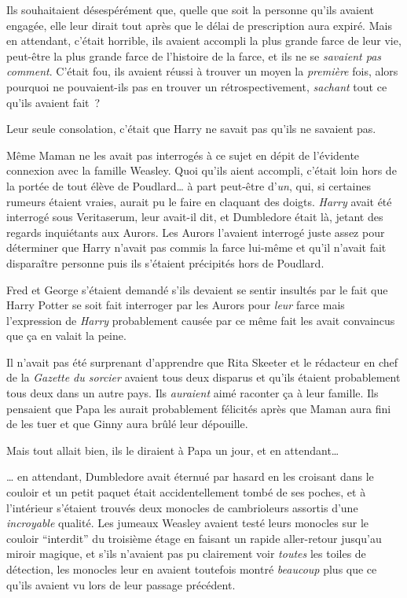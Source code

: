 Ils souhaitaient désespérément que, quelle que soit la personne qu'ils avaient engagée, elle leur dirait tout après que le délai de prescription aura expiré. Mais en attendant, c'était horrible, ils avaient accompli la plus grande farce de leur vie, peut-être la plus grande farce de l'histoire de la farce, et ils ne se \emph{savaient pas comment}. C'était fou, ils avaient réussi à trouver un moyen la \emph{première} fois, alors pourquoi ne pouvaient-ils pas en trouver un rétrospectivement, \emph{sachant} tout ce qu'ils avaient fait~?

Leur seule consolation, c'était que Harry ne savait pas qu'ils ne savaient pas.

Même Maman ne les avait pas interrogés à ce sujet en dépit de l'évidente connexion avec la famille Weasley. Quoi qu'ils aient accompli, c'était loin hors de la portée de tout élève de Poudlard… à part peut-être d'\emph{un}, qui, si certaines rumeurs étaient vraies, aurait pu le faire en claquant des doigts. \emph{Harry} avait été interrogé sous Veritaserum, leur avait-il dit, et Dumbledore était là, jetant des regards inquiétants aux Aurors. Les Aurors l'avaient interrogé juste assez pour déterminer que Harry n'avait pas commis la farce lui-même et qu'il n'avait fait disparaître personne puis ils s'étaient précipités hors de Poudlard.

Fred et George s'étaient demandé s'ils devaient se sentir insultés par le fait que Harry Potter se soit fait interroger par les Aurors pour \emph{leur} farce mais l'expression de \emph{Harry} probablement causée par ce même fait les avait convaincus que ça en valait la peine.

Il n'avait pas été surprenant d'apprendre que Rita Skeeter et le rédacteur en chef de la \emph{Gazette du sorcier} avaient tous deux disparus et qu'ils étaient probablement tous deux dans un autre pays. Ils \emph{auraient} aimé raconter ça à leur famille. Ils pensaient que Papa les aurait probablement félicités après que Maman aura fini de les tuer et que Ginny aura brûlé leur dépouille.

Mais tout allait bien, ils le diraient à Papa un jour, et en attendant…

… en attendant, Dumbledore avait éternué par hasard en les croisant dans le couloir et un petit paquet était accidentellement tombé de ses poches, et à l'intérieur s'étaient trouvés deux monocles de cambrioleurs assortis d'une \emph{incroyable} qualité. Les jumeaux Weasley avaient testé leurs monocles sur le couloir “interdit” du troisième étage en faisant un rapide aller-retour jusqu'au miroir magique, et s'ils n'avaient pas pu clairement voir \emph{toutes} les toiles de détection, les monocles leur en avaient toutefois montré \emph{beaucoup} plus que ce qu'ils avaient vu lors de leur passage précédent.

